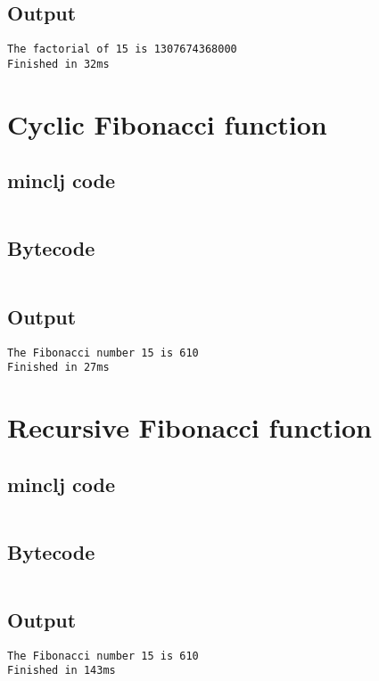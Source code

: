 \documentclass[11pt]{scrreprt}
\begin{document}
\subsection{Output}
\begin{verbatim}
The factorial of 15 is 1307674368000
Finished in 32ms
\end{verbatim}


\section{Cyclic Fibonacci function}
\subsection{minclj code}
\inputminted{clojure}{/home/mario/git/MarioJim/miniclj/examples/cyclic_fibonacci.clj}

\subsection{Bytecode}
\inputminted{text}{/home/mario/git/MarioJim/miniclj/examples/cyclic_fibonacci.mclj}

\subsection{Output}
\begin{verbatim}
The Fibonacci number 15 is 610
Finished in 27ms
\end{verbatim}


\section{Recursive Fibonacci function}
\subsection{minclj code}
\inputminted{clojure}{/home/mario/git/MarioJim/miniclj/examples/recursive_fibonacci.clj}

\subsection{Bytecode}
\inputminted{text}{/home/mario/git/MarioJim/miniclj/examples/recursive_fibonacci.mclj}

\subsection{Output}
\begin{verbatim}
The Fibonacci number 15 is 610
Finished in 143ms
\end{verbatim}
\end{document}
